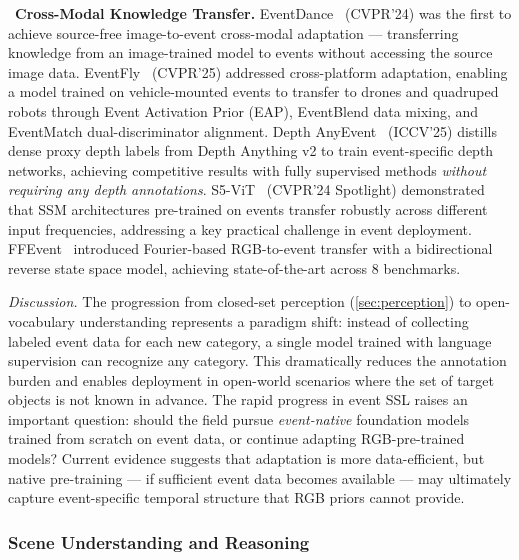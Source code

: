 \noindent{}~\textbf{Cross-Modal Knowledge Transfer.} EventDance~\cite{zheng2024eventdance} (CVPR'24) was the first to achieve source-free image-to-event cross-modal adaptation --- transferring knowledge from an image-trained model to events without accessing the source image data. EventFly~\cite{kong2025eventfly} (CVPR'25) addressed cross-platform adaptation, enabling a model trained on vehicle-mounted events to transfer to drones and quadruped robots through Event Activation Prior (EAP), EventBlend data mixing, and EventMatch dual-discriminator alignment. Depth AnyEvent~\cite{xu2025depthanycvent} (ICCV'25) distills dense proxy depth labels from Depth Anything v2 to train event-specific depth networks, achieving competitive results with fully supervised methods \textit{without requiring any depth annotations}. S5-ViT~\cite{zubic2024s5vit} (CVPR'24 Spotlight) demonstrated that SSM architectures pre-trained on events transfer robustly across different input frequencies, addressing a key practical challenge in event deployment. FFEvent~\cite{song2026ffevent} introduced Fourier-based RGB-to-event transfer with a bidirectional reverse state space model, achieving state-of-the-art across 8 benchmarks.

\textit{Discussion.} The progression from closed-set perception (\cref{sec:perception}) to open-vocabulary understanding represents a paradigm shift: instead of collecting labeled event data for each new category, a single model trained with language supervision can recognize any category. This dramatically reduces the annotation burden and enables deployment in open-world scenarios where the set of target objects is not known in advance. The rapid progress in event SSL raises an important question: should the field pursue \textit{event-native} foundation models trained from scratch on event data, or continue adapting RGB-pre-trained models? Current evidence suggests that adaptation is more data-efficient, but native pre-training --- if sufficient event data becomes available --- may ultimately capture event-specific temporal structure that RGB priors cannot provide.


\subsubsection{Scene Understanding and Reasoning}
\label{sec:understanding_reasoning}

